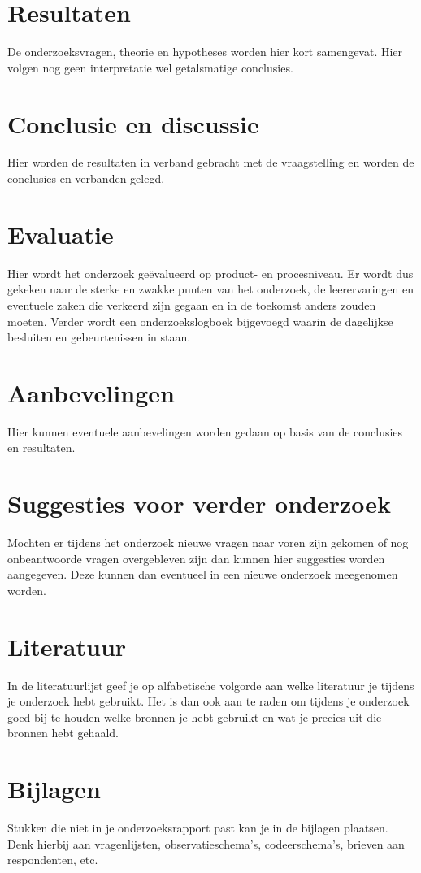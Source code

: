 \documentclass{article}
\begin{document}
\section{Resultaten}
De onderzoeksvragen, theorie en hypotheses worden hier kort samengevat. Hier volgen nog geen interpretatie wel getalsmatige conclusies.

\section{Conclusie en discussie}
Hier worden de resultaten in verband gebracht met de vraagstelling en worden de conclusies en verbanden gelegd.

\section{Evaluatie}
Hier wordt het onderzoek geëvalueerd op product- en procesniveau. Er wordt dus gekeken naar de sterke en zwakke punten van het onderzoek, de leerervaringen en eventuele zaken die verkeerd zijn gegaan en in de toekomst anders zouden moeten. Verder wordt een onderzoekslogboek bijgevoegd waarin de dagelijkse besluiten en gebeurtenissen in staan.

\section{Aanbevelingen}
Hier kunnen eventuele aanbevelingen worden gedaan op basis van de conclusies en resultaten.

\section{Suggesties voor verder onderzoek}
Mochten er tijdens het onderzoek nieuwe vragen naar voren zijn gekomen of nog onbeantwoorde vragen overgebleven zijn dan kunnen hier suggesties worden aangegeven. Deze kunnen dan eventueel in een nieuwe onderzoek meegenomen worden.

\section{Literatuur}
In de literatuurlijst geef je op alfabetische volgorde aan welke literatuur je tijdens je onderzoek hebt gebruikt. Het is dan ook aan te raden om tijdens je onderzoek goed bij te houden welke bronnen je hebt gebruikt en wat je precies uit die bronnen hebt gehaald.

\section{Bijlagen}
Stukken die niet in je onderzoeksrapport past kan je in de bijlagen plaatsen. Denk hierbij aan vragenlijsten, observatieschema’s, codeerschema’s, brieven aan respondenten, etc.
\end{document}
